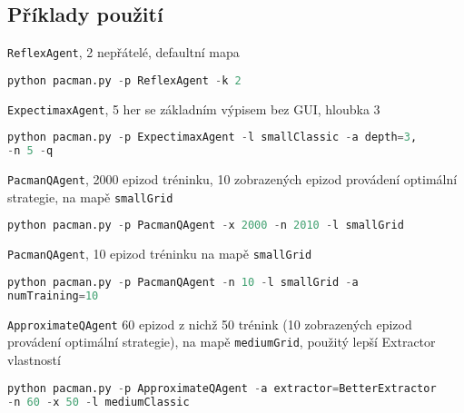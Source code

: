 \subsection{Příklady použití}
\texttt{ReflexAgent}, 2 nepřátelé, defaultní mapa
\begin{lstlisting}[language=Python,texcl=true]
python pacman.py -p ReflexAgent -k 2
\end{lstlisting}
\texttt{ExpectimaxAgent}, 5 her se základním výpisem bez GUI, hloubka 3
\begin{lstlisting}[language=Python,texcl=true]
python pacman.py -p ExpectimaxAgent -l smallClassic -a depth=3,
-n 5 -q
\end{lstlisting}
\texttt{PacmanQAgent}, 2000 epizod tréninku, 10 zobrazených epizod provádení optimální strategie, na mapě \texttt{smallGrid}
\begin{lstlisting}[language=Python,texcl=true]
python pacman.py -p PacmanQAgent -x 2000 -n 2010 -l smallGrid
\end{lstlisting}
\texttt{PacmanQAgent}, 10 epizod tréninku na mapě \texttt{smallGrid}
\begin{lstlisting}[language=Python,texcl=true]
python pacman.py -p PacmanQAgent -n 10 -l smallGrid -a
numTraining=10
\end{lstlisting}
\texttt{ApproximateQAgent} 60 epizod z nichž 50 trénink (10 zobrazených epizod provádení optimální strategie), na mapě \texttt{mediumGrid}, použitý lepší Extractor vlastností
\begin{lstlisting}[language=Python,texcl=true]
python pacman.py -p ApproximateQAgent -a extractor=BetterExtractor
-n 60 -x 50 -l mediumClassic
\end{lstlisting}

